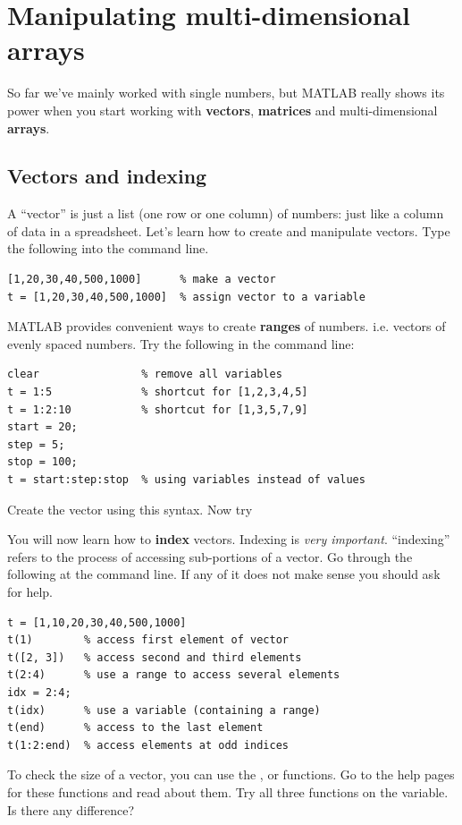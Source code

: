 \documentclass{article}
\begin{document}
\pagebreak

\section{Manipulating multi-dimensional arrays}

So far we've mainly worked with single numbers, but MATLAB really shows its power when you start working with \textbf{vectors}, \textbf{matrices} and multi-dimensional \textbf{arrays}.

\subsection{Vectors and indexing}

A ``vector'' is just a list (one row or one column) of numbers: just like a column of data in a spreadsheet.
Let's learn how to create and manipulate vectors.
Type the following into the command line.
\begin{lstlisting}
[1,20,30,40,500,1000]      % make a vector
t = [1,20,30,40,500,1000]  % assign vector to a variable
\end{lstlisting}

MATLAB provides convenient ways to create \textbf{ranges} of numbers. i.e. vectors of evenly spaced numbers.
Try the following in the command line:
\begin{lstlisting}
clear                % remove all variables
t = 1:5              % shortcut for [1,2,3,4,5]
t = 1:2:10           % shortcut for [1,3,5,7,9]
start = 20;
step = 5;
stop = 100;
t = start:step:stop  % using variables instead of values
\end{lstlisting}
Create the vector \mcode{[5,8,11,14]} using this syntax. Now try \mcode{[-1,-2,-3,-4]}

You will now learn how to \textbf{index} vectors.
Indexing is \emph{very important}.
``indexing'' refers to the process of accessing sub-portions of a vector.
Go through the following at the command line.
If any of it does not make sense you should ask for help.
\begin{lstlisting}
t = [1,10,20,30,40,500,1000]
t(1)        % access first element of vector
t([2, 3])   % access second and third elements
t(2:4)      % use a range to access several elements
idx = 2:4;
t(idx)      % use a variable (containing a range)
t(end)      % access to the last element
t(1:2:end)  % access elements at odd indices
\end{lstlisting}

To check the size of a vector, you can use the ,  or  functions.
Go to the help pages for these functions and read about them.
Try all three functions on the  variable. Is there any difference?
\end{document}
